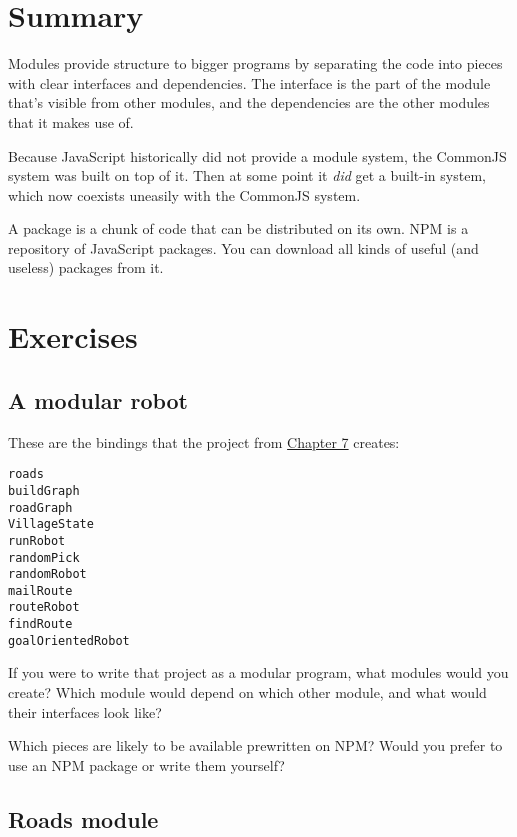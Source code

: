 \section{Summary}

Modules provide structure to bigger programs by separating the code into pieces with clear interfaces and dependencies. The interface is the part of the module that's visible from other modules, and the dependencies are the other modules that it makes use of.

Because JavaScript historically did not provide a module system, the CommonJS system was built on top of it. Then at some point it \emph{did} get a built-in system, which now coexists uneasily with the CommonJS system.

A package is a chunk of code that can be distributed on its own. NPM is a repository of JavaScript packages. You can download all kinds of useful (and useless) packages from it.

\section{Exercises}

\subsection{A modular robot}

\label{modules.modular_robot}These are the bindings that the project from \hyperref[robot]{Chapter 7} creates:

\begin{lstlisting}
roads
buildGraph
roadGraph
VillageState
runRobot
randomPick
randomRobot
mailRoute
routeRobot
findRoute
goalOrientedRobot
\end{lstlisting}
\noindent

If you were to write that project as a modular program, what modules would you create? Which module would depend on which other module, and what would their interfaces look like?

Which pieces are likely to be available prewritten on NPM? Would you prefer to use an NPM package or write them yourself?

\subsection{Roads module}

